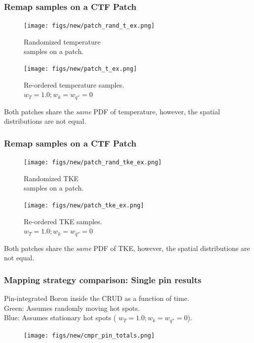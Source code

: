 \documentclass[t, pdftex]{beamer}
\begin{document}
\begin{frame}
\frametitle{Remap samples on a CTF Patch}
    \begin{figure}
        \centering
        \begin{minipage}{.5\textwidth}
            \centering
            \texttt{[image: figs/new/patch\_rand\_t\_ex.png]}
            \caption{\centering Randomized temperature \\ samples on a patch.}
        \end{minipage}%
        \begin{minipage}{.5\textwidth}
            \centering
            \texttt{[image: figs/new/patch\_t\_ex.png]}
            \caption{\centering Re-ordered temperature samples. \\ $w_T=1.0; w_k=w_{q''}=0$}
        \end{minipage}
    \end{figure}
Both patches share the \emph{same} PDF of temperature, however, the spatial distributions are not equal.
\end{frame}

\begin{frame}
\frametitle{Remap samples on a CTF Patch}
    \begin{figure}
        \centering
        \begin{minipage}{.5\textwidth}
            \centering
            \texttt{[image: figs/new/patch\_rand\_tke\_ex.png]}
            \caption{\centering Randomized TKE \\  samples on a patch.}
        \end{minipage}%
        \begin{minipage}{.5\textwidth}
            \centering
            \texttt{[image: figs/new/patch\_tke\_ex.png]}
            \caption{\centering Re-ordered TKE samples. \\  $w_T=1.0; w_k=w_{q''}=0$}
        \end{minipage}
    \end{figure}
Both patches share the \emph{same} PDF of TKE, however, the spatial distributions are not equal.
\end{frame}

\begin{frame}
\frametitle{Mapping strategy comparison: Single pin results}
\tiny{
Pin-integrated Boron inside the CRUD as a function of time.  \\ 
{\color{green} Green: Assumes randomly moving hot spots.} \\
{\color{blue} Blue: Assumes stationary hot spots ( $w_T=1.0; w_k=w_{q''}=0$).}
}
\begin{figure}[!htbp]
\centering
\texttt{[image: figs/new/cmpr\_pin\_totals.png]}
\label{model_overview}
\end{figure}
\end{frame}
\end{document}
